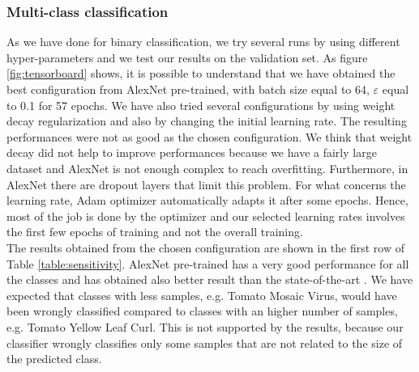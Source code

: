 \subsubsection{Multi-class classification}
As we have done for binary classification, we try several runs by using different hyper-parameters and we test our results on the validation set. As figure \ref{fig:tensorboard} shows, it is possible to understand that we have obtained the best configuration from AlexNet pre-trained, with batch size equal to 64, $\varepsilon$ equal to 0.1 for 57 epochs. We have also tried several configurations by using weight decay regularization and also by changing the initial learning rate. The resulting performances were not as good as the chosen configuration. We think that weight decay did not help to improve performances because we have a fairly large dataset and AlexNet is not enough complex to reach overfitting. Furthermore, in AlexNet there are dropout layers that limit this problem. For what concerns the learning rate, Adam optimizer \cite{ref32} automatically adapts it after some epochs. Hence, most of the job is done by the optimizer and our selected learning rates involves the first few epochs of training and not the overall training.
\\
The results obtained from the chosen configuration are shown in the first row of Table \ref{table:sensitivity}. AlexNet pre-trained has a very good performance for all the classes and has obtained also better result than the state-of-the-art \cite{ref11}. We have expected that classes with less samples, e.g. Tomato Mosaic Virus, would have been wrongly classified compared to classes with an higher number of samples, e.g. Tomato Yellow Leaf Curl. This is not supported by the results, because our classifier wrongly classifies only some samples that are not related to the size of the predicted class.
